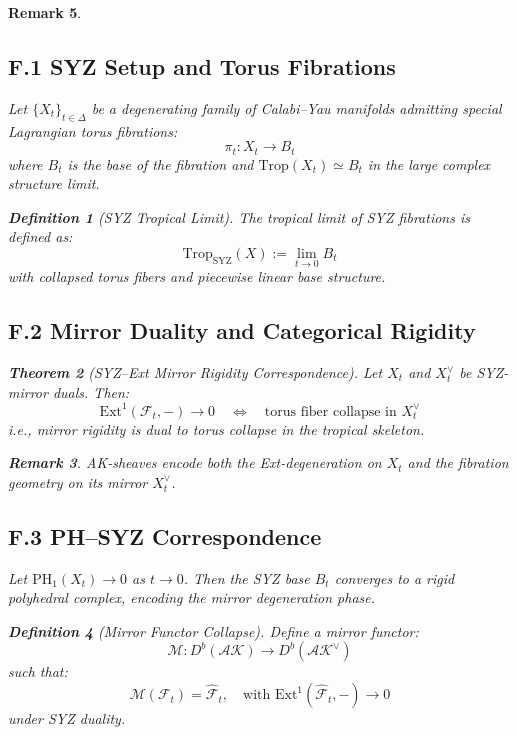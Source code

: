 \documentclass[11pt]{article}
\newtheorem{theorem}{Theorem}[section]
\newtheorem{definition}[theorem]{Definition}
\newtheorem{remark}[theorem]{Remark}
\begin{document}
\begin{remark}
\subsection*{F.1 SYZ Setup and Torus Fibrations}

Let \( \{X_t\}_{t \in \Delta} \) be a degenerating family of Calabi–Yau manifolds admitting special Lagrangian torus fibrations:
\[
\pi_t : X_t \to B_t
\]
where \( B_t \) is the base of the fibration and \( \mathrm{Trop}(X_t) \simeq B_t \) in the large complex structure limit.

\begin{definition}[SYZ Tropical Limit]
The tropical limit of SYZ fibrations is defined as:
\[
\mathrm{Trop}_{\mathrm{SYZ}}(X) := \lim_{t \to 0} B_t
\]
with collapsed torus fibers and piecewise linear base structure.
\end{definition}

\subsection*{F.2 Mirror Duality and Categorical Rigidity}

\begin{theorem}[SYZ–Ext Mirror Rigidity Correspondence]
Let \( X_t \) and \( X_t^\vee \) be SYZ-mirror duals. Then:
\[
\mathrm{Ext}^1(\mathcal{F}_t, -) \to 0 \quad \Leftrightarrow \quad \text{torus fiber collapse in } X_t^\vee
\]
i.e., mirror rigidity is dual to torus collapse in the tropical skeleton.
\end{theorem}

\begin{remark}
AK-sheaves encode both the Ext-degeneration on \( X_t \) and the fibration geometry on its mirror \( X_t^\vee \).
\end{remark}

\subsection*{F.3 PH–SYZ Correspondence}

\begin{proposition}
Let \( \mathrm{PH}_1(X_t) \to 0 \) as \( t \to 0 \). Then the SYZ base \( B_t \) converges to a rigid polyhedral complex, encoding the mirror degeneration phase.
\end{proposition}

\begin{definition}[Mirror Functor Collapse]
Define a mirror functor:
\[
\mathcal{M}: D^b(\mathcal{AK}) \to D^b(\mathcal{AK}^\vee)
\]
such that:
\[
\mathcal{M}(\mathcal{F}_t) = \widehat{\mathcal{F}}_t, \quad \text{with } \mathrm{Ext}^1(\widehat{\mathcal{F}}_t, -) \to 0
\]
under SYZ duality.
\end{definition}


\end{remark}
\end{document}
